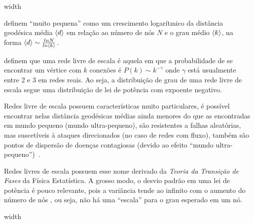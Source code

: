 \documentclass[10pt,a4paper,final]{article}
\newcommand\disappearingrule{%
  \par %
  \vskip10pt %
  \leaders\vrule width \textwidth\vskip0.4pt %
  \nointerlineskip %
  \vskip10pt %
}
\begin{document}
\disappearingrule

\begin{minipage}[t]{\linewidth}
  \begin{wrapfigure}{l}{0.5\textwidth}
  \end{wrapfigure}

   definem \enquote{muito pequena} como um crescimento logarítmico da distância geodésica média $\left\langle d \right\rangle$ em relação ao número de nós $N$ e o grau médio $\left\langle k \right\rangle$, na forma $\left\langle d \right\rangle \sim \frac{ln N}{ln \left\langle k \right\rangle}$.
  
   definem que uma rede livre de escala é aquela em que a probabilidade de se encontrar um vértice com $k$ conexões é $P(k) \sim k^{-\gamma}$ onde $\gamma$ está usualmente entre 2 e 3 em redes reais. Ao seja, a distribuição de grau de uma rede livre de escala segue uma distribuição de lei de potência com expoente negativo.
  
  Redes livre de escala possuem características muito particulares, é possível encontrar nelas distância geodésicas médias ainda menores do que as encontradas em mundo pequeno (mundo ultra-pequeno), são resistentes a falhas aleatórias, mas suscetíveis à ataques direcionados (no caso de redes com fluxo), também são pontos de dispersão de doenças contagiosas (devido ao efeito \enquote{mundo ultra-pequeno})~\cite{Barabasi2016-rn}. 
  
  Redes livres de escala possuem esse nome derivado da \textit{Teoria da Transição de Fases} da Física Estatística. A grosso modo, o desvio padrão em uma lei de potência é pouco relevante, pois a variância tende ao infinito com o aumento do número de nós \cite[pág. 122]{Barabasi2016-rn}, ou seja, não há uma \enquote{escala} para o grau esperado em um nó.
\end{minipage}

\disappearingrule
\end{document}
